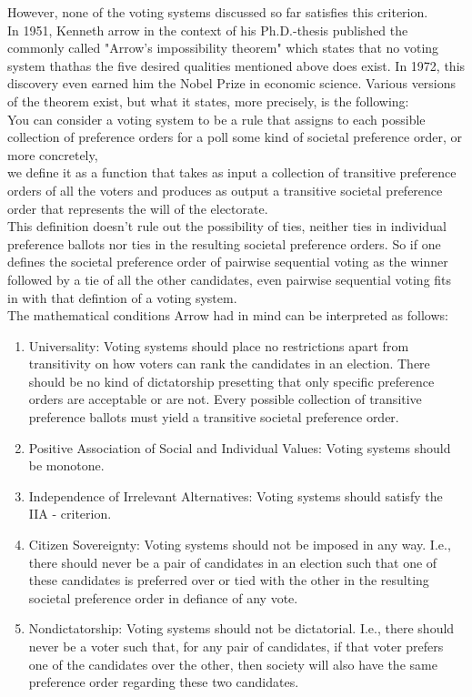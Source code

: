 However, none of the voting systems discussed so far satisfies this criterion. \\
In 1951, Kenneth arrow in the context of his Ph.D.-thesis published the commonly called "Arrow's impossibility theorem" which states that no voting system thathas the five desired qualities mentioned above does exist. In 1972, this discovery even earned him the Nobel Prize in economic science. Various versions of the theorem exist, but what it states, more precisely, is the following: \\
You can consider a voting system to be a rule that assigns to each possible collection of preference orders for a poll some kind of societal preference order, or more concretely, \\
we define it as a function that takes as input a collection of transitive preference orders of all the voters and produces as output a transitive societal preference order that represents the will of the electorate. \\
This definition doesn't rule out the possibility of ties, neither ties in individual preference ballots nor ties in the resulting societal preference orders. So if one defines the societal preference order of pairwise sequential voting as the winner followed by a tie of all the other candidates, even pairwise sequential voting fits in with that defintion of a voting system. \\
The mathematical conditions Arrow had in mind can be interpreted as follows: 
\begin{enumerate} %
\item Universality: Voting systems should place no restrictions apart from transitivity on how voters can rank the candidates in an election. There should be no kind of dictatorship presetting that only specific preference orders are acceptable or are not. Every possible collection of transitive preference ballots must yield a transitive societal preference order. 
\item Positive Association of Social and Individual Values: Voting systems should be monotone. 
\item Independence of Irrelevant Alternatives: Voting systems should satisfy the IIA - criterion. 
\item Citizen Sovereignty: Voting systems should not be imposed in any way. I.e., there should never be a pair of candidates in an election such that one of these candidates is preferred over or tied with the other in the resulting societal preference order in defiance of any vote. 
\item Nondictatorship: Voting systems should not be dictatorial. I.e., there should never be a voter such that, for any pair of candidates, if that voter prefers one of the candidates over the other, then society will also have the same preference order regarding these two candidates. 
\end{enumerate} 
